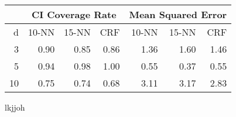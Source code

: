 \documentclass[a4paper,10pt]{article}
\begin{document}
\begin{table}[ht]
\centering
\begin{tabular}{rrrrrrr}
  & \multicolumn{3}{c}{CI Coverage Rate}& \multicolumn{3}{c}{Mean Squared Error}\\ \hline
d & 10-NN & 15-NN & CRF & 10-NN & 15-NN & CRF \\ 
  \hline
  3 & 0.90 & 0.85 & 0.86 & 1.36 & 1.60 & 1.46 \\ 
    5 & 0.94 & 0.98 & 1.00 & 0.55 & 0.37 & 0.55 \\ 
   10 & 0.75 & 0.74 & 0.68 & 3.11 & 3.17 & 2.83 \\ 
   \hline
\end{tabular}
\end{table}


lkjjoh
\end{document}
